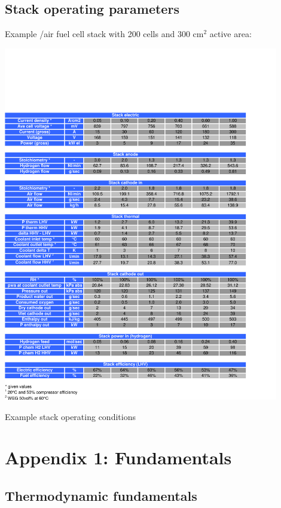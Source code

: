 \documentclass[11pt,a4paper,english,twoside]{scrreprt}
\begin{document}
\section{Stack operating parameters}

Example /air fuel cell stack with 200 cells and 300 cm$^2$ active area:

\begin{table}
  \centering
  \includegraphics*[width=0.9\textwidth,angle=0]{FCF_Table_stack.pdf}
  \caption[Example stack opeating conditions]{Example stack operating conditions}
  \label{tab:SOC}
\end{table}



\chapter{Appendix 1: Fundamentals}


\section{Thermodynamic fundamentals}
\label{sec:Thermodynamics}
\end{document}
